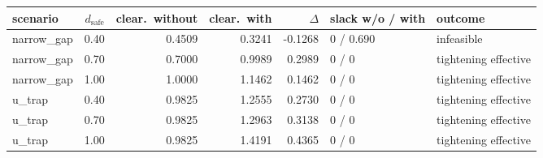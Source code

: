 \begin{tabular}{lrrrrll}
  \toprule
  scenario & $d_{\mathrm{safe}}$ & clear.\ without & clear.\ with & $\Delta$ & slack w/o / with & outcome \\
  \midrule
  narrow\_gap & 0.40 & 0.4509 & 0.3241 & -0.1268 & 0 / 0.690 & infeasible \\
  narrow\_gap & 0.70 & 0.7000 & 0.9989 & 0.2989 & 0 / 0 & tightening effective \\
  narrow\_gap & 1.00 & 1.0000 & 1.1462 & 0.1462 & 0 / 0 & tightening effective \\
  u\_trap & 0.40 & 0.9825 & 1.2555 & 0.2730 & 0 / 0 & tightening effective \\
  u\_trap & 0.70 & 0.9825 & 1.2963 & 0.3138 & 0 / 0 & tightening effective \\
  u\_trap & 1.00 & 0.9825 & 1.4191 & 0.4365 & 0 / 0 & tightening effective \\
  \bottomrule
\end{tabular}
